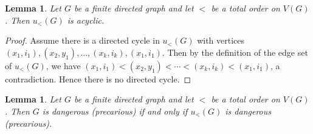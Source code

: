 \documentclass[12pt]{article}
\newtheorem{lem}[thm]{Lemma}
\theoremstyle{remark}
\begin{document}
\begin{lem}\label{UnrollingKillsCycles}
Let $G$ be a finite directed graph and let $<$ be a total order on $V(G)$.  Then
$u_{<}(G)$ is acyclic.
\end{lem}
\begin{proof}
Assume there is a directed cycle in $u_{<}(G)$ with vertices $(x_1, i_1), (x_2, y_1), \ldots, (x_k, i_k), (x_1, i_1)$.  Then by the definition of the edge set of $u_{<}(G)$, we have $(x_1, i_1) < (x_2, y_1) < \cdots < (x_k, i_k) < (x_1, i_1)$, a contradiction.  Hence there is no directed cycle.
\end{proof}

\begin{lem}\label{UnrollingPreservesDanger}
Let $G$ be a finite directed graph and let $<$ be a total order on $V(G)$.  Then $G$ is dangerous (precarious) if and only if $u_{<}(G)$ is dangerous (precarious).
\end{lem}
\end{document}
